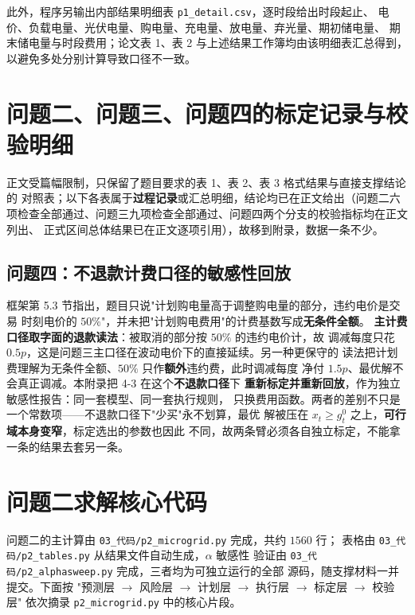 \documentclass[withoutpreface,bwprint]{cumcmthesis}
\begin{document}
\begin{appendices}
此外，程序另输出内部结果明细表 \texttt{p1\_detail.csv}，逐时段给出时段起止、
电价、负载电量、光伏电量、购电量、充电量、放电量、弃光量、期初储电量、
期末储电量与时段费用；论文表 1、表 2 与上述结果工作簿均由该明细表汇总得到，
以避免多处分别计算导致口径不一致。

\newpage
\section{问题二、问题三、问题四的标定记录与校验明细}

正文受篇幅限制，只保留了题目要求的表 1、表 2、表 3 格式结果与直接支撑结论的
对照表；以下各表属于\textbf{过程记录}或汇总明细，结论均已在正文给出（问题二六
项检查全部通过、问题三九项检查全部通过、问题四两个分支的校验指标均在正文列出、
正式区间总体结果已在正文逐项引用），故移到附录，数据一条不少。







\subsection{问题四：不退款计费口径的敏感性回放}
\label{app:p4-refund}

框架第 5.3 节指出，题目只说"计划购电量高于调整购电量的部分，违约电价是交易
时刻电价的 $50\%$"，并未把"计划购电费用"的计费基数写成\textbf{无条件全额}。
\textbf{主计费口径取字面的退款读法}：被取消的部分按 $50\%$ 的违约电价计，故
调减每度只花 $0.5p$，这是问题三主口径在波动电价下的直接延续。另一种更保守的
读法把计划费理解为无条件全额、$50\%$ 只作\textbf{额外}违约费，此时调减每度
净付 $1.5p$、最优解不会真正调减。本附录把 4-3 在这个\textbf{不退款口径}下
\textbf{重新标定并重新回放}，作为独立敏感性报告：同一套模型、同一套执行规则，
只换费用函数。两者的差别不只是一个常数项——不退款口径下"少买"永不划算，最优
解被压在 $x_t\ge g_t^0$ 之上，\textbf{可行域本身变窄}，标定选出的参数也因此
不同，故两条臂必须各自独立标定，不能拿一条的结果去套另一条。



\newpage
\section{问题二求解核心代码}

问题二的主计算由 \texttt{03\_代码/p2\_microgrid.py} 完成，共约 $1560$ 行；
表格由 \texttt{03\_代码/p2\_tables.py} 从结果文件自动生成，$\alpha$ 敏感性
验证由 \texttt{03\_代码/p2\_alphasweep.py} 完成，三者均为可独立运行的全部
源码，随支撑材料一并提交。下面按
"预测层 $\to$ 风险层 $\to$ 计划层 $\to$ 执行层 $\to$ 标定层 $\to$ 校验层"
依次摘录 \texttt{p2\_microgrid.py} 中的核心片段。


\end{appendices}
\end{document}
